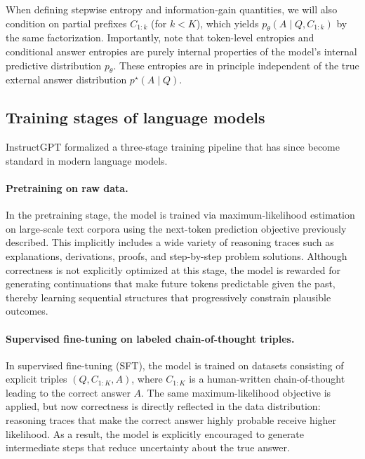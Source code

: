 \documentclass{article}
\begin{document}
When defining stepwise entropy and information-gain quantities, we will also condition on partial prefixes $C_{1:k}$ (for $k<K$), which yields $p_\theta(A\mid Q,C_{1:k})$ by the same factorization. Importantly, note that token-level entropies and conditional answer entropies are purely internal properties of the model's internal predictive distribution $p_\theta$. These entropies are in principle independent of the true external answer distribution $p^\star(A\mid Q)$.



\subsection{Training stages of language models}

InstructGPT \cite{ouyang2022traininglanguagemodelsfollow} formalized a three-stage training pipeline that has since become standard in modern language models.

\paragraph{Pretraining on raw data.} In the pretraining stage, the model is trained via maximum-likelihood estimation on large-scale text corpora using the next-token prediction objective previously described. This implicitly includes a wide variety of reasoning traces such as explanations, derivations, proofs, and step-by-step problem solutions. Although correctness is not explicitly optimized at this stage, the model is rewarded for generating continuations that make future tokens predictable given the past, thereby learning sequential structures that progressively constrain plausible outcomes.

\paragraph{Supervised fine-tuning on labeled chain-of-thought triples.} In supervised fine-tuning (SFT), the model is trained on datasets consisting of explicit triples $(Q, C_{1:K}, A)$, where $C_{1:K}$ is a human-written chain-of-thought leading to the correct answer $A$. The same maximum-likelihood objective is applied, but now correctness is directly reflected in the data distribution: reasoning traces that make the correct answer highly probable receive higher likelihood. As a result, the model is explicitly encouraged to generate intermediate steps that reduce uncertainty about the true answer.
\end{document}
